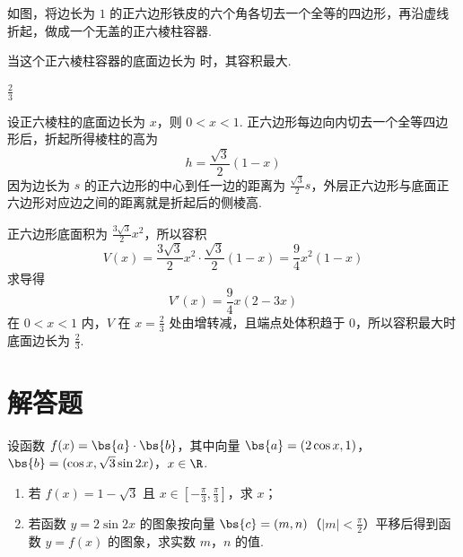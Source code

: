 \begin{problem}
如图，将边长为 \(1\) 的正六边形铁皮的六个角各切去一个全等的四边形，再沿虚线折起，做成一个无盖的正六棱柱容器.


当这个正六棱柱容器的底面边长为\fillinblank{} 时，其容积最大.
\end{problem}

\begin{answer}\(\frac{2}{3}\)\end{answer}

\begin{solution}
设正六棱柱的底面边长为 \(x\)，则 \(0<x<1\).  正六边形每边向内切去一个全等四边形后，折起所得棱柱的高为
\[
h=\frac{\sqrt3}{2}(1-x)
\]
因为边长为 \(s\) 的正六边形的中心到任一边的距离为 \(\frac{\sqrt3}{2}s\)，外层正六边形与底面正六边形对应边之间的距离就是折起后的侧棱高.

正六边形底面积为 \(\frac{3\sqrt3}{2}x^2\)，所以容积
\[
V(x)=\frac{3\sqrt3}{2}x^2\cdot\frac{\sqrt3}{2}(1-x)=\frac94x^2(1-x)
\]
求导得
\[
V'(x)=\frac94x(2-3x)
\]
在 \(0<x<1\) 内，\(V\) 在 \(x=\frac23\) 处由增转减，且端点处体积趋于 0，所以容积最大时底面边长为 \(\frac23\).
\end{solution}

\section{解答题}
\begin{problem}
设函数 \(f(x)=\bs{a}\cdot\bs{b}\)，其中向量 \(\bs{a}=(2\cos x,1)\)，\(\bs{b}=(\cos x,\sqrt{3}\sin 2x)\)，\(x\in\R\).

\begin{enumerate}
\item 若 \(f(x)=1-\sqrt{3}\) 且 \(x\in\left[-\frac{\pi}{3},\frac{\pi}{3}\right]\)，求 \(x\)；
\item 若函数 \(y=2\sin 2x\) 的图象按向量 \(\bs{c}=(m,n)\)（\(|m|<\frac{\pi}{2}\)）平移后得到函数 \(y=f(x)\) 的图象，求实数 \(m\)，\(n\) 的值.
\end{enumerate}
\end{problem}

